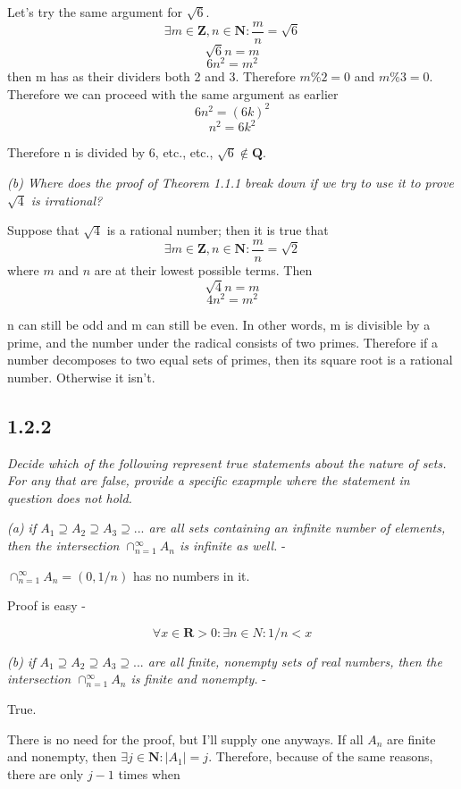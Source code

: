 \documentclass[11pt,oneside,titlepage]{book}
\begin{document}
Let's try the same argument for $\sqrt{6}$.
$$\exists m \in \textbf{Z}, n \in \textbf{N}: \frac{m}{n} = \sqrt{6}$$
$$\sqrt{6}n = m$$
$$6n^2 = m^2$$
then m has as their dividers both 2 and 3. Therefore $m\%2 = 0$ and $m\%3 = 0$.
Therefore we can proceed with the same argument as earlier
$$6n^2 = (6k)^2$$
$$n^2 = 6k^2$$

Therefore n is divided by 6, etc., etc., $\sqrt{6} \notin \textbf{Q}$.

\textit{(b) Where does the proof of Theorem 1.1.1 break down if we try to use
  it to prove $\sqrt{4}$ is irrational? }

Suppose that $\sqrt{4}$ is a rational number; then it is true that
$$\exists m \in \textbf{Z}, n \in \textbf{N}: \frac{m}{n} = \sqrt{2}$$
where $m$ and $n$ are at their lowest possible terms. Then
$$\sqrt{4}n = m$$
$$4n^2 = m^2$$

n can still be odd and m can still be even. In other words, m is divisible by
a prime, and the number under the radical consists of two primes. Therefore
if a number decomposes to two equal sets of primes, then its square root is
a rational number. Otherwise it isn't.

\subsection*{1.2.2}

\textit{Decide which of the following represent true statements about the
  nature of sets. For any that are false, provide a specific exapmple where the
  statement in question does not hold.}

\textit{(a) if $A_1 \supseteq A_2 \supseteq A_3 \supseteq ... $ are all sets
  containing an infinite number of elements, then the intersection
  $\cap_{n = 1}^{\infty} A_n$ is infinite as well.} -

$\cap_{n = 1}^{\infty} A_n = (0, 1/n)$ has no numbers in it.

Proof is easy -

$$\forall x \in \textbf{R} > 0: \exists n \in N: 1/n < x$$

\textit{(b) if $A_1 \supseteq A_2 \supseteq A_3 \supseteq ... $ are all finite,
  nonempty sets of real numbers, then the intersection
  $\cap_{n = 1}^{\infty} A_n$ is finite and nonempty.} -

True.

There is no need for the proof, but I'll supply one anyways. If all $A_n$ are
finite and nonempty, then $\exists j \in \textbf{N} : |A_1| = j$. Therefore,
because of the same reasons, there are only $j - 1$ times when
\end{document}
